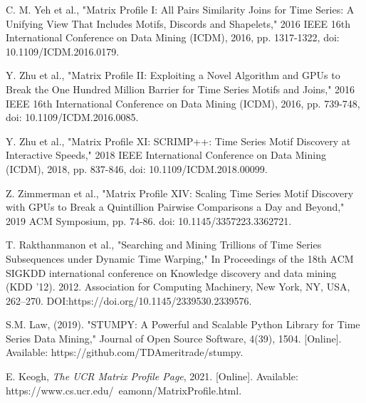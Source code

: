 \documentclass[conference]{IEEEtran}
\begin{document}
\begin{thebibliography}{7}  

 C. M. Yeh et al., "Matrix Profile I: All Pairs Similarity Joins for Time Series: A Unifying View That Includes Motifs, Discords and Shapelets," 2016 IEEE 16th International Conference on Data Mining (ICDM), 2016, pp. 1317-1322, doi: 10.1109/ICDM.2016.0179.

 Y. Zhu et al., "Matrix Profile II: Exploiting a Novel Algorithm and GPUs to Break the One Hundred Million Barrier for Time Series Motifs and Joins," 2016 IEEE 16th International Conference on Data Mining (ICDM), 2016, pp. 739-748, doi: 10.1109/ICDM.2016.0085.

 Y. Zhu et al., "Matrix Profile XI: SCRIMP++: Time Series Motif Discovery at Interactive Speeds," 2018 IEEE International Conference on Data Mining (ICDM), 2018, pp. 837-846, doi: 10.1109/ICDM.2018.00099.

 Z. Zimmerman et al., "Matrix Profile XIV: Scaling Time Series Motif Discovery with GPUs to Break a Quintillion Pairwise Comparisons a Day and Beyond," 2019 ACM Symposium, pp. 74-86. doi: 10.1145/3357223.3362721. 

 T. Rakthanmanon et al., "Searching and Mining Trillions of Time Series Subsequences under Dynamic Time Warping," In Proceedings of the 18th ACM SIGKDD international conference on Knowledge discovery and data mining (KDD '12). 2012. Association for Computing Machinery, New York, NY, USA, 262–270. DOI:https://doi.org/10.1145/2339530.2339576.

 S.M. Law, (2019). "STUMPY: A Powerful and Scalable Python Library for Time Series Data Mining," Journal of Open Source Software, 4(39), 1504. [Online]. Available: https://github.com/TDAmeritrade/stumpy.

 E. Keogh, \emph{The UCR Matrix Profile Page}, 2021. [Online]. Available: https://www.cs.ucr.edu/~eamonn/MatrixProfile.html.


\end{thebibliography}
\end{document}
